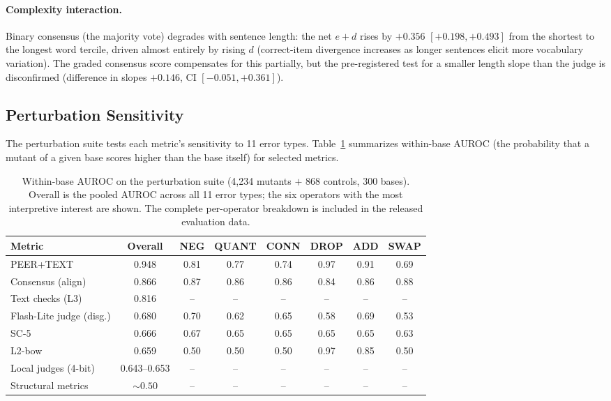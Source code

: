 \documentclass[11pt,letterpaper]{article}
\begin{document}
\paragraph{Complexity interaction.}
Binary consensus (the majority vote) degrades with sentence length: the net $e + d$ rises by $+0.356$ $[+0.198, +0.493]$ from the shortest to the longest word tercile, driven almost entirely by rising $d$ (correct-item divergence increases as longer sentences elicit more vocabulary variation). The graded consensus score compensates for this partially, but the pre-registered test for a smaller length slope than the judge is disconfirmed (difference in slopes $+0.146$, CI $[-0.051, +0.361]$).

\subsection{Perturbation Sensitivity}

The perturbation suite tests each metric's sensitivity to 11 error types. Table~\ref{tab:perturbation} summarizes within-base AUROC (the probability that a mutant of a given base scores higher than the base itself) for selected metrics.

\begin{table}[!htbp]
\centering
\caption{Within-base AUROC on the perturbation suite (4,234 mutants $+$ 868 controls, 300 bases). Overall is the pooled AUROC across all 11 error types; the six operators with the most interpretive interest are shown. The complete per-operator breakdown is included in the released evaluation data.}
\label{tab:perturbation}
\small
\begin{tabular}{@{}lccccccc@{}}
\toprule
Metric & Overall & NEG & QUANT & CONN & DROP & ADD & SWAP \\
\midrule
PEER+TEXT           & 0.948 & 0.81 & 0.77 & 0.74 & 0.97 & 0.91 & 0.69 \\
Consensus (align)   & 0.866 & 0.87 & 0.86 & 0.86 & 0.84 & 0.86 & 0.88 \\
Text checks (L3)    & 0.816 & --   & --   & --   & --   & --   & --   \\
Flash-Lite judge (disg.) & 0.680 & 0.70 & 0.62 & 0.65 & 0.58 & 0.69 & 0.53 \\
SC-5                & 0.666 & 0.67 & 0.65 & 0.65 & 0.65 & 0.65 & 0.63 \\
L2-bow              & 0.659 & 0.50 & 0.50 & 0.50 & 0.97 & 0.85 & 0.50 \\
Local judges (4-bit)& 0.643--0.653 & -- & -- & -- & -- & -- & -- \\
Structural metrics  & ${\sim}0.50$ & -- & -- & -- & -- & -- & -- \\
\bottomrule
\end{tabular}
\end{table}
\end{document}
